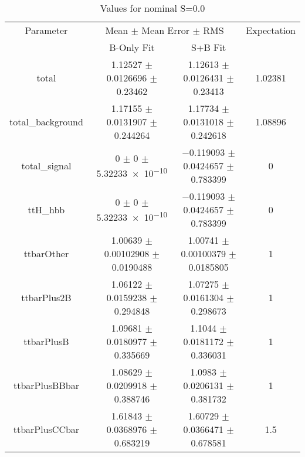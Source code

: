 \begin{table}
\centering
\caption{Values for nominal S=0.0}
\begin{tabular}{cccc}
\toprule
Parameter & \multicolumn{2}{c}{Mean $\pm$ Mean Error $\pm$ RMS} & Expectation\\
 & B-Only Fit & S+B Fit & \\
\midrule
total & \num{1.12527} $\pm$ \num{0.0126696} $\pm$ \num{0.23462} & \num{1.12613} $\pm$ \num{0.0126431} $\pm$ \num{0.23413} & \num{1.02381}\\
total\_background & \num{1.17155} $\pm$ \num{0.0131907} $\pm$ \num{0.244264} & \num{1.17734} $\pm$ \num{0.0131018} $\pm$ \num{0.242618} & \num{1.08896}\\
total\_signal & \num{0} $\pm$ \num{0} $\pm$ \num{5.32233e-10} & \num{-0.119093} $\pm$ \num{0.0424657} $\pm$ \num{0.783399} & \num{0}\\
ttH\_hbb & \num{0} $\pm$ \num{0} $\pm$ \num{5.32233e-10} & \num{-0.119093} $\pm$ \num{0.0424657} $\pm$ \num{0.783399} & \num{0}\\
ttbarOther & \num{1.00639} $\pm$ \num{0.00102908} $\pm$ \num{0.0190488} & \num{1.00741} $\pm$ \num{0.00100379} $\pm$ \num{0.0185805} & \num{1}\\
ttbarPlus2B & \num{1.06122} $\pm$ \num{0.0159238} $\pm$ \num{0.294848} & \num{1.07275} $\pm$ \num{0.0161304} $\pm$ \num{0.298673} & \num{1}\\
ttbarPlusB & \num{1.09681} $\pm$ \num{0.0180977} $\pm$ \num{0.335669} & \num{1.1044} $\pm$ \num{0.0181172} $\pm$ \num{0.336031} & \num{1}\\
ttbarPlusBBbar & \num{1.08629} $\pm$ \num{0.0209918} $\pm$ \num{0.388746} & \num{1.0983} $\pm$ \num{0.0206131} $\pm$ \num{0.381732} & \num{1}\\
ttbarPlusCCbar & \num{1.61843} $\pm$ \num{0.0368976} $\pm$ \num{0.683219} & \num{1.60729} $\pm$ \num{0.0366471} $\pm$ \num{0.678581} & \num{1.5}\\
\bottomrule
\end{tabular}
\end{table}